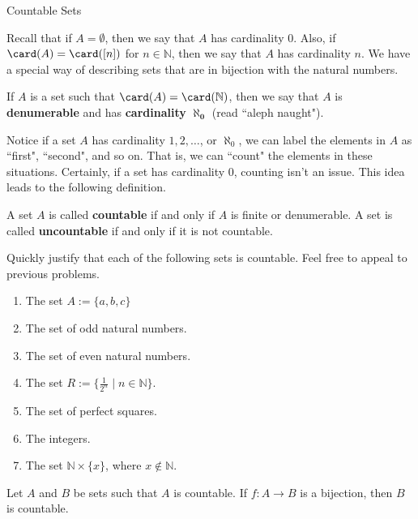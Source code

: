 \begin{section}{Countable Sets}

Recall that if $A=\emptyset$, then we say that $A$ has cardinality 0.  Also, if $\card(A)=\card([n])$ for $n\in\mathbb{N}$, then we say that $A$ has cardinality $n$.  We have a special way of describing sets that are in bijection with the natural numbers.

\begin{definition}
If $A$ is a set such that $\card(A)=\card(\mathbb{N})$, then we say that $A$ is \textbf{denumerable} and has \textbf{cardinality} $\mathbf{\aleph_0}$ (read ``aleph naught").
\end{definition}

Notice if a set $A$ has cardinality $1,2,\ldots$, or $\aleph_0$, we can label the elements in $A$ as ``first", ``second", and so on.  That is, we can ``count" the elements in these situations. Certainly, if a set has cardinality 0, counting isn't an issue.  This idea leads to the following definition.

\begin{definition}\label{def:countable}
A set $A$ is called \textbf{countable} if and only if $A$ is finite or denumerable. A set is called \textbf{uncountable} if and only if it is not countable.
\end{definition}

\begin{exercise}
Quickly justify that each of the following sets is countable. Feel free to appeal to previous problems.
\begin{enumerate}[label=\textrm{(\alph*)}]
\item The set $A:=\{a,b,c\}$
\item The set of odd natural numbers.
\item The set of even natural numbers.
\item The set $R:=\{\frac{1}{2^n}\mid n\in \mathbb{N}\}$.
\item The set of perfect squares.
\item The integers.
\item The set $\mathbb{N}\times \{x\}$, where $x\notin \mathbb{N}$.
\end{enumerate}
\end{exercise}

\begin{theorem}
Let $A$ and $B$ be sets such that $A$ is countable. If $f:A\to B$ is a bijection, then $B$ is countable.
\end{theorem}


\end{section}
